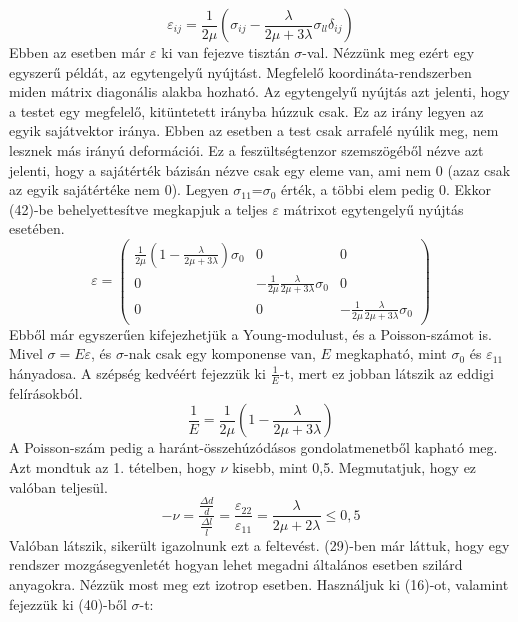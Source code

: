 \documentclass[a4paper,12pt]{article}
\begin{document}
\begin{equation}
\varepsilon_{ij}=\frac{1}{2\mu}(\sigma_{ij}-\frac{\lambda}{2\mu+3\lambda}\sigma_{ll}\delta_{ij})
\end{equation}
Ebben az esetben már $\varepsilon$ ki van fejezve tisztán $\sigma$-val. Nézzünk meg ezért egy egyszerű példát, az egytengelyű nyújtást. Megfelelő koordináta-rendszerben miden mátrix diagonális alakba hozható. Az egytengelyű nyújtás azt jelenti, hogy a testet egy megfelelő, kitüntetett irányba húzzuk csak. Ez az irány legyen az egyik sajátvektor iránya. Ebben az esetben a test csak arrafelé nyúlik meg, nem lesznek más irányú deformációi. Ez a feszültségtenzor szemszögéből nézve azt jelenti, hogy a sajátérték bázisán nézve csak egy eleme van, ami nem 0 (azaz csak az egyik sajátértéke nem 0). Legyen $\sigma_{11}$=$\sigma_0$ érték, a többi elem pedig 0. Ekkor (42)-be behelyettesítve megkapjuk a teljes $\varepsilon$ mátrixot egytengelyű nyújtás esetében.
\begin{equation}
\varepsilon=\begin{pmatrix}
\frac{1}{2\mu}(1-\frac{\lambda}{2\mu+3\lambda})\sigma_0 & 0 & 0 \\
0 & -\frac{1}{2\mu}\frac{\lambda}{2\mu+3\lambda}\sigma_0 & 0 \\
0 & 0 & -\frac{1}{2\mu}\frac{\lambda}{2\mu+3\lambda}\sigma_0 
\end{pmatrix}
\end{equation}
Ebből már egyszerűen kifejezhetjük a Young-modulust, és a Poisson-számot is. Mivel $\sigma=E\varepsilon$, és $\sigma$-nak csak egy komponense van, $E$ megkapható, mint $\sigma_0$ és $\varepsilon_{11}$ hányadosa. A szépség kedvéért fejezzük ki $\frac{1}{E}$-t, mert ez jobban látszik az eddigi felírásokból.
\begin{equation}
\frac{1}{E}=\frac{1}{2\mu}(1-\frac{\lambda}{2\mu+3\lambda})
\end{equation}
A Poisson-szám pedig a haránt-összehúzódásos gondolatmenetből kapható meg. Azt mondtuk az 1. tételben, hogy $\nu$ kisebb, mint 0,5. Megmutatjuk, hogy ez valóban teljesül.
\begin{equation}
-\nu=\frac{\frac{\Delta d}{d}}{\frac{\Delta l}{l}}=\frac{\varepsilon_{22}}{\varepsilon_{11}}=\frac{\lambda}{2\mu+2\lambda}\leq 0,5
\end{equation}
Valóban látszik, sikerült igazolnunk ezt a feltevést.
(29)-ben már láttuk, hogy egy rendszer mozgásegyenletét hogyan lehet megadni általános esetben szilárd anyagokra. Nézzük most meg ezt izotrop esetben. Használjuk ki (16)-ot, valamint fejezzük ki (40)-ből $\sigma$-t:
\end{document}
